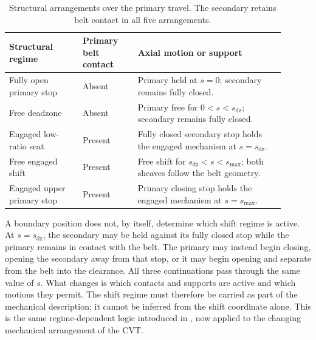 \documentclass[11pt]{report}
\numberwithin{equation}{section}
\begin{document}
\begin{table}[H]
    \centering
    \small
    \renewcommand{\arraystretch}{1.18}
    \begin{tabular}{@{}
        >{\raggedright\arraybackslash}p{0.24\linewidth}
        >{\raggedright\arraybackslash}p{0.18\linewidth}
        >{\raggedright\arraybackslash}p{0.48\linewidth}
        @{}}
        \toprule
        \textbf{Structural regime}
        & \textbf{Primary belt contact}
        & \textbf{Axial motion or support}
        \\
        \midrule
        Fully open primary stop
        & Absent
        & Primary held at \(s=0\); secondary remains fully closed.
        \\[4pt]
        Free deadzone
        & Absent
        & Primary free for \(0<s<s_{\mathrm{dz}}\); secondary remains
          fully closed.
        \\[4pt]
        Engaged low-ratio seat
        & Present
        & Fully closed secondary stop holds the engaged mechanism at
          \(s=s_{\mathrm{dz}}\).
        \\[4pt]
        Free engaged shift
        & Present
        & Free shift for \(s_{\mathrm{dz}}<s<s_{\max}\); both sheaves
          follow the belt geometry.
        \\[4pt]
        Engaged upper primary stop
        & Present
        & Primary closing stop holds the engaged mechanism at
          \(s=s_{\max}\).
        \\
        \bottomrule
    \end{tabular}
    \caption{Structural arrangements over the primary travel. The secondary
    retains belt contact in all five arrangements.}
    \label{tab:shift_structural_arrangements}
\end{table}

A boundary position does not, by itself, determine which shift regime
is active. At \(s=s_{\mathrm{dz}}\), the secondary may be held against its
fully closed stop while the primary remains in contact with the belt. The
primary may instead begin closing, opening the secondary away from that stop,
or it may begin opening and separate from the belt into the clearance. All
three continuations pass through the same value of \(s\). What changes is
which contacts and supports are active and which motions they permit. The
shift regime must therefore be carried as part of the mechanical
description; it cannot be inferred from the shift coordinate alone. This is
the same regime-dependent logic introduced in
, now applied to the changing
mechanical arrangement of the CVT.
\end{document}

